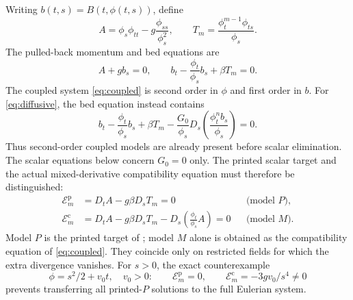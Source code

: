 \documentclass[11pt,a4paper,oneside]{report}
\numberwithin{equation}{chapter}
\newcommand{\E}{\mathcal E}
\begin{document}
Writing $b(t,s)=B(t,\phi(t,s))$, define
\begin{equation}
A=\phi_s\phi_{tt}-g\frac{\phi_{ss}}{\phi_s^2},\qquad
T_m=\frac{\phi_t^{m-1}\phi_{ts}}{\phi_s}.
\end{equation}
The pulled-back momentum and bed equations are
\begin{equation}\label{eq:coupled}
A+gb_s=0,\qquad b_t-\frac{\phi_t}{\phi_s}b_s+\beta T_m=0.
\end{equation}
The coupled system \eqref{eq:coupled} is second order in $\phi$ and first order in $b$. For \eqref{eq:diffusive}, the bed equation instead contains
\begin{equation}\label{eq:diffusive-material}
b_t-\frac{\phi_t}{\phi_s}b_s+\beta T_m
-\frac{G_0}{\phi_s}D_s\!\left(\frac{\phi_t^n b_s}{\phi_s}\right)=0.
\end{equation}
Thus second-order coupled models are already present before scalar elimination. The scalar equations below concern $G_0=0$ only.
The printed scalar target and the actual mixed-derivative compatibility
equation must therefore be distinguished:
\begin{align}
\E_m^{\mathrm p}&=D_tA-g\beta D_sT_m=0 &&\text{(model $P$)},\label{eq:printed}\\
\E_m^{\mathrm c}&=D_tA-g\beta D_sT_m-D_s\!\left(\frac{\phi_t}{\phi_s}A\right)=0 &&\text{(model $M$)}.\label{eq:corrected}
\end{align}
Model $P$ is the printed target of \cite{ap}; model $M$ alone is obtained
as the compatibility equation of \eqref{eq:coupled}. They coincide only
on restricted fields for which the extra divergence vanishes.
For $s>0$, the exact counterexample
\begin{equation}\label{eq:PM-counterexample}
\phi=s^2/2+v_0t,\quad v_0>0:\qquad
\E_m^{\mathrm p}=0,\qquad \E_m^{\mathrm c}=-3gv_0/s^4\ne0
\end{equation}
prevents transferring all printed-$P$ solutions to the full Eulerian system.
\end{document}
